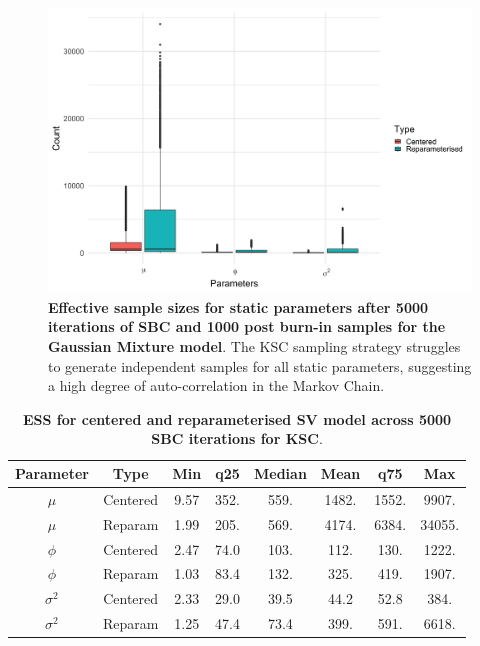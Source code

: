 \documentclass[12pt, a4paper]{article}
\begin{document}


    \begin{figure}[H]
        \centering
        \includegraphics[scale=0.1]{results/ksc_ess.png}
        \caption{\textbf{Effective sample sizes for static parameters after 5000 iterations of SBC and 1000 post burn-in samples for the Gaussian Mixture model}. The KSC sampling strategy struggles to generate independent samples for all static parameters, suggesting a high degree of auto-correlation in the Markov Chain.}
        \label{fig:kscess}
    \end{figure}

    \begin{table}[H]
        \centering
        \begin{tabular}{|c|c|c|c|c|c|c|c|} \hline 
        Parameter &  Type&Min& q25&  Median& Mean & q75&Max\\ \hline 
        $\mu$&  Centered&9.57 & 352. & 559. & 1482. & 1552. & 9907.\\
     $\mu$&  Reparam&1.99 & 205. & 569. & 4174. & 6384. & 34055.\\\hline 
     $\phi$&  Centered&2.47 & 74.0 & 103. & 112. & 130. & 1222.\\
     $\phi$&  Reparam&1.03 & 83.4 & 132. & 325. & 419. & 1907. \\ \hline 
     $\sigma^2$&  Centered&2.33 & 29.0 & 39.5 & 44.2 & 52.8 & 384. \\ 
     $\sigma^2$&  Reparam&1.25 & 47.4 & 73.4 & 399. & 591. & 6618. \\ \hline
        \end{tabular}
        \caption{\textbf{ESS for centered and reparameterised SV model across 5000 SBC iterations for KSC}.}
        \label{tab:kscess}
    \end{table}
\end{document}
